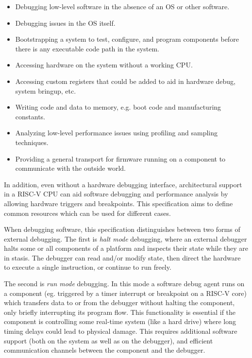 \begin{itemize}

\item Debugging low-level software in the absence of an OS or other software.

\item Debugging issues in the OS itself.

\item Bootstrapping a system to test, configure, and program components before
  there is any executable code path in the system.

\item Accessing hardware on the system without a working CPU.

\item Accessing custom registers that could be added to aid in hardware debug, system bringup,
etc.

\item Writing code and data to memory, e.g. boot code and manufacturing constants.

\item Analyzing low-level performance issues using profiling and sampling techniques.

\item Providing a general transport for firmware running on a component to communicate with the
  outside world.

\end{itemize}

In addition, even without a hardware debugging interface,
architectural support in a RISC-V CPU can aid software debugging and
performance analysis by allowing hardware triggers and breakpoints.
This specification aims to define common resources which can be used
for different cases.

When debugging software, this specification distinguishes between two
forms of external debugging. The first is \emph{halt mode} debugging,
where an external debugger halts some or all components of a
platform and inspects their state while they are in stasis.
The debugger can read and/or modify state, then direct the hardware
to execute a single instruction, or continue to run freely.

The second is \emph{run mode} debugging. In this mode a software
debug agent runs on a component (eg.  triggered by a timer interrupt or breakpoint
on a RISC-V core) which transfers data to or from the debugger
without halting the component, only briefly interrupting its program flow.
This functionality is essential if the component is controlling some real-time system (like a
hard drive) where long timing delays could lead to physical damage.
This requires additional software support (both on the system as well as on the debugger),
and efficient communication channels between the component and the debugger.

